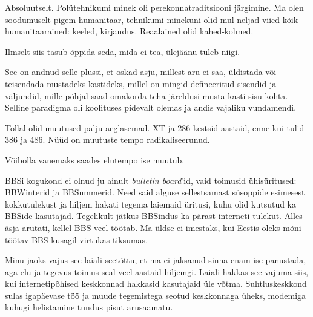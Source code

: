 
Absoluutselt. Polütehnikumi minek oli perekonnatraditsiooni järgimine. Ma olen soodumuselt pigem humanitaar, tehnikumi minekuni olid mul neljad-viied kõik humanitaarained: 
keeled, kirjandus. Reaalained olid kahed-kolmed.

Ilmselt siis tasub õppida seda, mida ei tea, ülejäänu tuleb niigi. 

See on andnud selle plussi, et oskad 
asju, millest aru ei saa, üldistada või teisendada mustadeks 
kastideks, millel on mingid defineeritud sisendid ja väljundid, mille põhjal 
saad omakorda teha järeldusi musta kasti sisu kohta. 
Selline paradigma oli koolituses pidevalt olemas ja andis vajaliku vundamendi.


Tollal olid muutused palju aeglasemad. XT 
ja 286 kestsid aastaid, enne kui tulid 386 ja 486. Nüüd on 
muutuste tempo radikaliseerunud.


Võibolla vanemaks saades elutempo ise muutub.


BBSi kogukond ei olnud ju ainult \emph{bulletin board}'id, 
vaid toimusid ühisüritused: BBWinterid ja 
BBSummerid. Need said alguse sellestsamast 
süsoppide esimesest kokkutulekust ja hiljem hakati tegema laiemaid üritusi, kuhu olid kutsutud ka BBSide kasutajad. Tegelikult jätkus BBSindus ka pärast
interneti tulekut. Alles äsja arutati, kellel 
BBS veel töötab. Ma üldse ei imestaks, kui Eestis oleks mõni töötav BBS 
kusagil virtukas tiksumas. 

Minu jaoks vajus see laiali seetõttu, et ma ei 
jaksanud sinna enam ise panustada, aga elu ja tegevus toimus seal veel 
aastaid hiljemgi. Laiali hakkas see vajuma siis, kui 
internetipõhised keskkonnad hakkasid kasutajaid üle võtma. 
Suhtluskeskkond sulas igapäevase töö ja muude tegemistega seotud keskkonnaga 
üheks, modemiga kuhugi helistamine tundus pisut arusaamatu.


